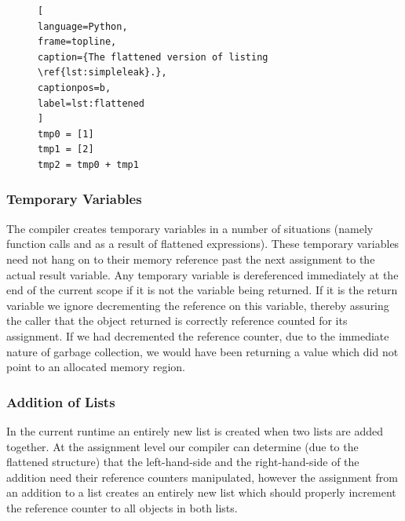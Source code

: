 \documentclass{sigplanconf}
\begin{document}
\begin{figure}[h!]
\begin{lstlisting}[
language=Python,
frame=topline,
caption={The flattened version of listing \ref{lst:simpleleak}.},
captionpos=b,
label=lst:flattened
]
tmp0 = [1]
tmp1 = [2]
tmp2 = tmp0 + tmp1
\end{lstlisting}
\end{figure}

\subsubsection{Temporary Variables}
The compiler creates temporary variables in a number of situations (namely function calls and as a result of flattened expressions).  These temporary variables need not hang on to their memory reference past the next assignment to the actual result variable.  Any temporary variable is dereferenced immediately at the end of the current scope if it is not the variable being returned.  If it is the return variable we ignore decrementing the reference on this variable, thereby assuring the caller that the object returned is correctly reference counted for its assignment.  If we had decremented the reference counter, due to the immediate nature of garbage collection, we would have been returning a value which did not point to an allocated memory region.

\subsubsection{Addition of Lists}
In the current runtime an entirely new list is created when two lists are added together.  At the assignment level our compiler can determine (due to the flattened structure) that the left-hand-side and the right-hand-side of the addition need their reference counters manipulated, however the assignment from an addition to a list creates an entirely new list which should properly increment the reference counter to all objects in both lists.
\end{document}
